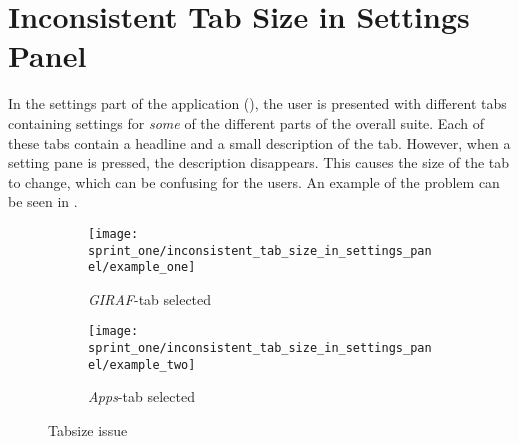 
\section{Inconsistent Tab Size in Settings Panel}
\label{sec:inconsistent_tab_size_in_settings_panel}

In the settings part of the \launcher application (), the user is presented with different tabs containing settings for \emph{some} of the different parts of the overall \giraf suite. Each of these tabs contain a headline and a small description of the tab. However, when a setting pane is pressed, the description disappears. This causes the size of the tab to change, which can be confusing for the users. An example of the problem can be seen in .\\

\begin{figure}[!htbp]
    \centering

    \begin{subfigure}[t]{0.3\textwidth}
        \texttt{[image: sprint\_one/inconsistent\_tab\_size\_in\_settings\_panel/example\_one]}
        \caption{\emph{GIRAF}-tab selected}
        \label{fig:inconsistent_tab_size_in_settings_panel_example_one}
    \end{subfigure}
    \hspace{5em} 
    \begin{subfigure}[t]{0.3\textwidth}
        \texttt{[image: sprint\_one/inconsistent\_tab\_size\_in\_settings\_panel/example\_two]}
        \caption{\emph{Apps}-tab selected}
        \label{fig:inconsistent_tab_size_in_settings_panel_example_two}
    \end{subfigure}
    
    \caption{Tabsize issue}
    \label{fig:inconsistent_tab_size_in_settings_panel_example}
\end{figure}

